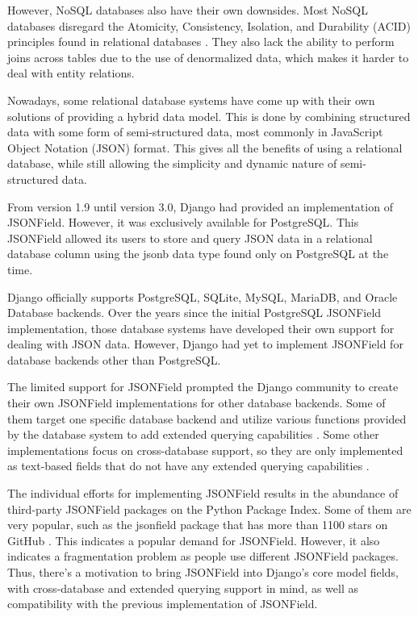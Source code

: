 However, NoSQL databases also have their own downsides. Most NoSQL databases
disregard the Atomicity, Consistency, Isolation, and Durability (ACID)
principles found in relational databases \cite{kyle_mongodb}. They also lack
the ability to perform joins across tables due to the use of denormalized data,
which makes it harder to deal with entity relations.

Nowadays, some relational database systems have come up with their own
solutions of providing a hybrid data model. This is done by combining
structured data with some form of semi-structured data, most commonly in
JavaScript Object Notation (JSON) format. This gives all the benefits of using
a relational database, while still allowing the simplicity and dynamic nature
of semi-structured data.

From version 1.9 until version 3.0, Django had provided an implementation of
JSONField. However, it was exclusively available for PostgreSQL. This JSONField
allowed its users to store and query JSON data in a relational database column
using the jsonb data type found only on PostgreSQL at the time.

Django officially supports PostgreSQL, SQLite, MySQL, MariaDB, and Oracle
Database backends. Over the years since the initial PostgreSQL JSONField
implementation, those database systems have developed their own support for
dealing with JSON data. However, Django had yet to implement JSONField for
database backends other than PostgreSQL.

The limited support for JSONField prompted the Django community to create their
own JSONField implementations for other database backends. Some of them target
one specific database backend and utilize various functions provided by the
database system to add extended querying capabilities \cite{mysql_jsonfield}
\cite{oracle_jsonfield}. Some other implementations focus on cross-database
support, so they are only implemented as text-based fields that do not have any
extended querying capabilities \cite{ryan_jsonfield}.

The individual efforts for implementing JSONField results in the abundance of
third-party JSONField packages on the Python Package Index. Some of them are
very popular, such as the jsonfield package that has more than 1100 stars on
GitHub \cite{ryan_jsonfield}. This indicates a popular demand for JSONField.
However, it also indicates a fragmentation problem as people use different
JSONField packages. Thus, there's a motivation to bring JSONField into Django's
core model fields, with cross-database and extended querying support in mind,
as well as compatibility with the previous implementation of JSONField.

